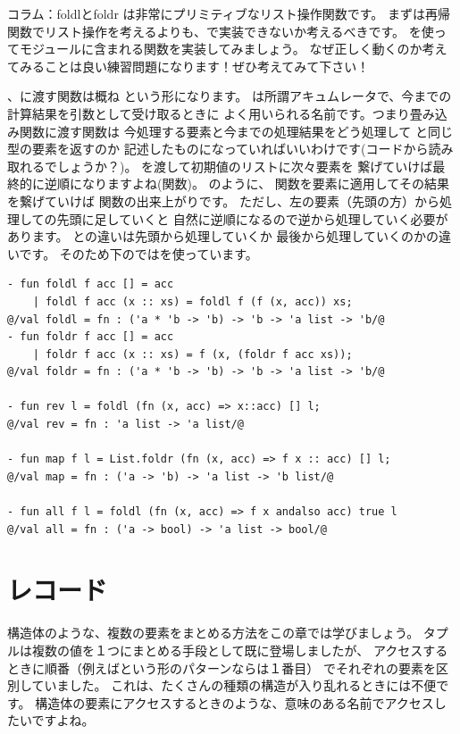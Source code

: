 \documentclass[11pt,a4paper]{article}
\begin{document}
\begin{itembox}[l]{コラム：foldlとfoldr}
  は非常にプリミティブなリスト操作関数です。
  まずは再帰関数でリスト操作を考えるよりも、で実装できないか考えるべきです。
  を使ってモジュールに含まれる関数を実装してみましょう。
  なぜ正しく動くのか考えてみることは良い練習問題になります！ぜひ考えてみて下さい！

  、に渡す関数は概ね
  という形になります。
  は所謂アキュムレータで、今までの計算結果を引数として受け取るときに
  よく用いられる名前です。つまり畳み込み関数に渡す関数は
  今処理する要素と今までの処理結果をどう処理して
  と同じ型の要素を返すのか
  記述したものになっていればいいわけです(コードから読み取れるでしょうか？)。
  を渡して初期値のリストに次々要素を
  繋げていけば最終的に逆順になりますよね(関数)。
  のように、
  関数を要素に適用してその結果を繋げていけば
  関数の出来上がりです。
  ただし、左の要素（先頭の方）から処理しての先頭に足していくと
  自然に逆順になるので逆から処理していく必要があります。
  との違いは先頭から処理していくか
  最後から処理していくのかの違いです。
  そのため下のではを使っています。

\begin{lstlisting}
- fun foldl f acc [] = acc
    | foldl f acc (x :: xs) = foldl f (f (x, acc)) xs;
@/val foldl = fn : ('a * 'b -> 'b) -> 'b -> 'a list -> 'b/@
- fun foldr f acc [] = acc
    | foldr f acc (x :: xs) = f (x, (foldr f acc xs));
@/val foldr = fn : ('a * 'b -> 'b) -> 'b -> 'a list -> 'b/@

- fun rev l = foldl (fn (x, acc) => x::acc) [] l;
@/val rev = fn : 'a list -> 'a list/@

- fun map f l = List.foldr (fn (x, acc) => f x :: acc) [] l;
@/val map = fn : ('a -> 'b) -> 'a list -> 'b list/@

- fun all f l = foldl (fn (x, acc) => f x andalso acc) true l
@/val all = fn : ('a -> bool) -> 'a list -> bool/@
\end{lstlisting}
\end{itembox}

\section{レコード}
\label{sec:record}
構造体のような、複数の要素をまとめる方法をこの章では学びましょう。
タプルは複数の値を１つにまとめる手段として既に登場しましたが、
アクセスするときに順番（例えばという形のパターンならは１番目）
でそれぞれの要素を区別していました。
これは、たくさんの種類の構造が入り乱れるときには不便です。
構造体の要素にアクセスするときのような、意味のある名前でアクセスしたいですよね。
\end{document}
